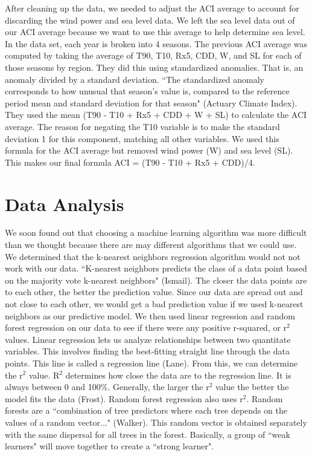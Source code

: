 \documentclass[12pt]{report}
\begin{document}
		\par After cleaning up the data, we needed to adjust the ACI average to account for discarding the wind power and sea level data. We left the sea level data out of our ACI average because we want to use this average to help determine sea level. In the data set, each year is broken into 4 seasons. The previous ACI average was computed by taking the average of T90, T10, Rx5, CDD, W, and SL for each of those seasons by region. They did this using standardized anomalies. That is, an anomaly divided by a standard deviation. \textquotedblleft The standardized anomaly corresponds to how unusual that season's value is, compared to the reference period mean and standard deviation for that season" (Actuary Climate Index). They used the mean (T90 - T10 + Rx5 + CDD + W + SL) to calculate the ACI average. The reason for negating the T10 variable is to make the standard deviation 1 for this component, matching all other variables. We used this formula for the ACI average but removed wind power (W) and sea level (SL). This makes our final formula ACI = (T90 - T10 + Rx5 + CDD)/4.
		
\section* {Data Analysis} 
		
\indent	\par We soon found out that choosing a machine learning algorithm was more difficult than we thought because there are may different algorithms that we could use. We determined that the k-nearest neighbors regression algorithm would not not work with our data. \textquotedblleft K-nearest neighbors predicts the class of a data point based on the majority vote k-nearest neighbors" (Ismail). The closer the data points are to each other, the better the prediction value. Since our data are spread out and not close to each other, we would get a bad prediction value if we used k-nearest neighbors as our predictive model. We then used linear regression and random forest regression on our data to see if there were any positive r-squared, or r$^2$ values. Linear regression lets us analyze relationships between two quantitate variables. This involves finding the best-fitting straight line through the data points. This line is called a regression line (Lane). From this, we can determine the r$^2$ value. R$^2$ determines how close the data are to the regression line. It is always between 0 and 100\%.  Generally, the larger the r$^2$ value the better the model fits the data (Frost). Random forest regression also uses r$^2$. Random forests are a  \textquotedblleft combination of tree predictors where each tree depends on the values of a random vector..." (Walker). This random vector is obtained separately with the same dispersal for all trees in the forest. Basically, a group of ``weak learners" will move together to create a ``strong learner".
\end{document}
